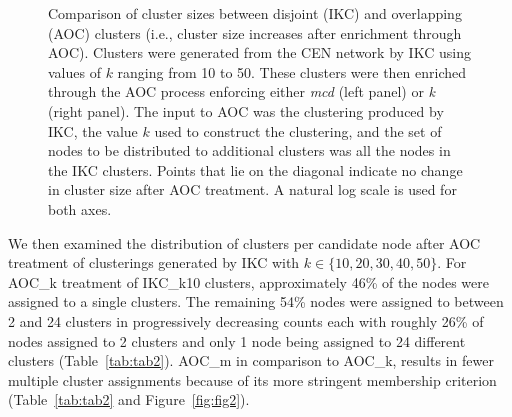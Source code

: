 \documentclass[11pt, oneside]{article}   	%
\begin{document}
\begin{figure}[H]
\begin{subfigure}[t]{0.48\textwidth}
    	\end{subfigure}
\caption{Comparison of cluster sizes between disjoint (IKC)  and overlapping (AOC) clusters (i.e., cluster size increases after enrichment through AOC). Clusters were generated from the CEN network by IKC using values of $k$ ranging from 10 to 50. These clusters were then enriched through the AOC process enforcing either \emph{mcd} (left panel) or \emph{k} (right panel). 
The input to AOC was the  clustering produced by IKC, the value $k$ used to construct the clustering, and the set of nodes to be distributed to additional clusters was all the nodes in the IKC clusters.  Points that lie on the diagonal indicate no change in cluster size after AOC treatment. A natural log scale is used for both axes.}
\label{fig:fig1}
\end{figure}

We then examined the distribution of clusters per candidate node after AOC treatment of clusterings generated by  IKC with $k \in \{10, 20, 30, 40, 50\}$. For AOC\_k treatment of IKC\_k10 clusters, approximately 46\% of the nodes were assigned to a single clusters. The remaining 54\% nodes were assigned to between 2 and 24 clusters in progressively decreasing counts each with roughly 26\% of nodes assigned to 2 clusters and only 1 node being assigned to 24 different clusters (Table~\ref{tab:tab2}). AOC\_m in comparison to AOC\_k, results in fewer multiple cluster assignments because of its more stringent membership criterion (Table~\ref{tab:tab2} and Figure~\ref{fig:fig2}).
\end{document}
